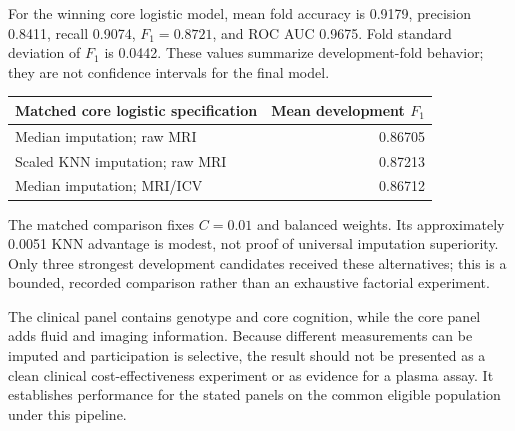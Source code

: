 \documentclass[11pt,a4paper]{article}
\begin{document}
For the winning core logistic model, mean fold accuracy is 0.9179, precision 0.8411, recall 0.9074, $F_1=0.8721$, and ROC AUC 0.9675. Fold standard deviation of $F_1$ is 0.0442. These values summarize development-fold behavior; they are not confidence intervals for the final model.
\begin{center}\small\renewcommand{\arraystretch}{1.15}
\begin{tabular}{p{.70\linewidth}r}\toprule
Matched core logistic specification & Mean development $F_1$\\\midrule
Median imputation; raw MRI & 0.86705\\
Scaled KNN imputation; raw MRI & 0.87213\\
Median imputation; MRI/ICV & 0.86712\\
\bottomrule\end{tabular}\end{center}
The matched comparison fixes $C=0.01$ and balanced weights. Its approximately 0.0051 KNN advantage is modest, not proof of universal imputation superiority. Only three strongest development candidates received these alternatives; this is a bounded, recorded comparison rather than an exhaustive factorial experiment.

The clinical panel contains genotype and core cognition, while the core panel adds fluid and imaging information. Because different measurements can be imputed and participation is selective, the result should not be presented as a clean clinical cost-effectiveness experiment or as evidence for a plasma assay. It establishes performance for the stated panels on the common eligible population under this pipeline.

\clearpage
\end{document}
